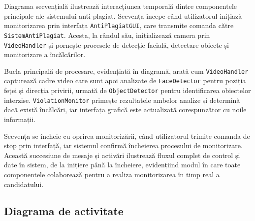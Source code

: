 \documentclass[12pt,a4paper]{article}
\begin{document}
        Diagrama secvențială ilustrează interacțiunea temporală dintre componentele principale ale sistemului anti-plagiat. Secvența începe când utilizatorul inițiază monitorizarea prin interfața \texttt{AntiPlagiatGUI}, care transmite comanda către \texttt{SistemAntiPlagiat}. Acesta, la rândul său, inițializează camera prin \texttt{VideoHandler} și pornește procesele de detecție facială, detectare obiecte și monitorizare a încălcărilor.

        Bucla principală de procesare, evidențiată în diagramă, arată cum \texttt{VideoHandler} capturează cadre video care sunt apoi analizate de \texttt{FaceDetector} pentru poziția feței și direcția privirii, urmată de \texttt{ObjectDetector} pentru identificarea obiectelor interzise. \texttt{ViolationMonitor} primește rezultatele ambelor analize și determină dacă există încălcări, iar interfața grafică este actualizată corespunzător cu noile informații.

        Secvența se încheie cu oprirea monitorizării, când utilizatorul trimite comanda de stop prin interfață, iar sistemul confirmă încheierea procesului de monitorizare. Această succesiune de mesaje și activări ilustrează fluxul complet de control și date în sistem, de la inițiere până la încheiere, evidențiind modul în care toate componentele colaborează pentru a realiza monitorizarea în timp real a candidatului.


\subsection{Diagrama de activitate}
\end{document}
